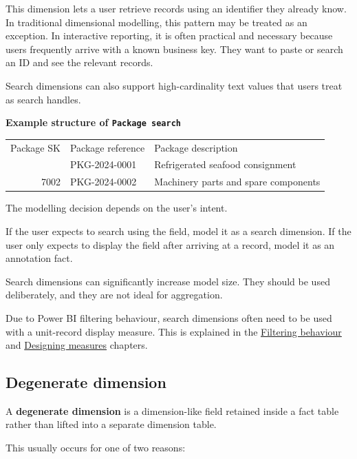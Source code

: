 \documentclass[10pt,openany,10pt]{book}
\newcounter{none}
\let\podeToprule\toprule
\let\podeMidrule\midrule
\let\podeBottomrule\bottomrule
\renewcommand{\toprule}{\arrayrulecolor{pbiGrid}\podeToprule}
\renewcommand{\midrule}{\arrayrulecolor{pbiGrid}\podeMidrule}
\renewcommand{\bottomrule}{\arrayrulecolor{pbiGrid}\podeBottomrule}
\begin{document}
This dimension lets a user retrieve records using an identifier they
already know. In traditional dimensional modelling, this pattern may be
treated as an exception. In interactive reporting, it is often practical
and necessary because users frequently arrive with a known business key.
They want to paste or search an ID and see the relevant records.

Search dimensions can also support high-cardinality text values that
users treat as search handles.

\textbf{Example structure of
\texttt{\textquotesingle{}Package\ search\textquotesingle{}}}

{\def\LTcaptype{none} %
\begin{longtable}[]{@{}rll@{}}
\toprule\noalign{}
Package SK & Package reference & Package description \\
\midrule\noalign{}
\endhead
\bottomrule\noalign{}
\endlastfoot
7001 & PKG-2024-0001 & Refrigerated seafood consignment \\
7002 & PKG-2024-0002 & Machinery parts and spare components \\
\end{longtable}
}

The modelling decision depends on the user's intent.

If the user expects to search using the field, model it as a search
dimension. If the user only expects to display the field after arriving
at a record, model it as an annotation fact.

Search dimensions can significantly increase model size. They should be
used deliberately, and they are not ideal for aggregation.

Due to Power BI filtering behaviour, search dimensions often need to be
used with a unit-record display measure. This is explained in the
\hyperref[docs-presenting-insights-filtering-behaviour]{Filtering
behaviour} and
\hyperref[docs-presenting-insights-designing-measures]{Designing
measures} chapters.

\subsection{Degenerate dimension}\label{degenerate-dimension}

A \textbf{degenerate dimension} is a dimension-like field retained
inside a fact table rather than lifted into a separate dimension table.

This usually occurs for one of two reasons:
\end{document}
